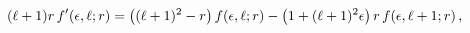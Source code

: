 \[(\ell+1)r\mathop{f\/}\nolimits'\!\left(\epsilon,\ell;r\right)=\left((\ell+1)^{%
2}-r\right)\mathop{f\/}\nolimits\!\left(\epsilon,\ell;r\right)-{\left(1+(\ell+%
1)^{2}\epsilon\right)r\mathop{f\/}\nolimits\!\left(\epsilon,\ell+1;r\right),}\]